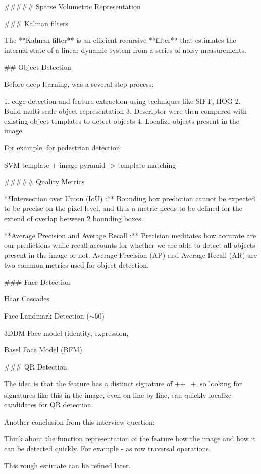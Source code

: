 ##### Sparse Volumetric Representation



### Kalman filters

The **Kalman filter** is an efficient recursive **filter** that estimates the internal state of a linear dynamic system from a series of noisy measurements.



## Object Detection

Before deep learning,  was a several step process: 

1. edge detection and feature extraction using techniques like SIFT, HOG 
2. Build multi-scale object representation
3. Descriptor were then compared with existing object templates to detect objects
4. Localize objects present in the image.

For example, for pedestrian detection:

SVM template + image pyramid -> template matching

##### Quality Metrics

**Intersection over Union (IoU) :** Bounding box prediction cannot be expected to be precise on the pixel level, and thus a metric needs to be defined for the extend of overlap between 2 bounding boxes.

**Average Precision and Average Recall :** Precision meditates how accurate are our predictions while recall accounts for whether we are able to detect all objects present in the image or not. Average Precision (AP) and Average Recall (AR) are two common metrics used for object detection.

### Face Detection

Haar Cascades

Face Landmark Detection ($\sim 60$)

3DDM Face model (identity, expression,

Basel Face Model (BFM)

### QR Detection

The idea is that the feature has a distinct signature of $++__++$ so looking for signatures like this in the image, even on line by line, can quickly localize candidates for QR detection. 

Another conclusion from this interview question: 

Think about the function representation of the feature how the image and how it can be detected quickly. For example - as row traversal operations.

This rough estimate can be refined later.

